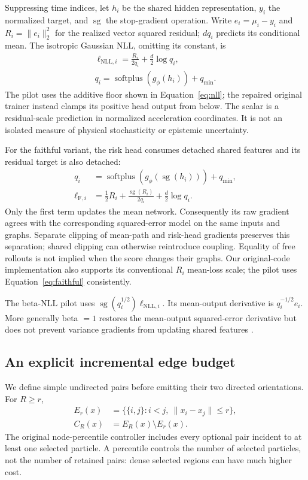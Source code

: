 Suppressing time indices, let $h_i$ be the shared hidden representation, $y_i$ the normalized target, and $\operatorname{sg}$ the stop-gradient operation. Write $e_i=\mu_i-y_i$ and $R_i=\|e_i\|_2^2$ for the realized vector squared residual; $dq_i$ predicts its conditional mean. The isotropic Gaussian NLL, omitting its constant, is
\begin{align}
 \ell_{\mathrm{NLL},i}=\frac{R_i}{2q_i}+\frac d2\log q_i,\nonumber\\
 q_i=\operatorname{softplus}(g_\phi(h_i))+q_{\min}.
 \label{eq:nll}
\end{align}
The pilot uses the additive floor shown in Equation~\ref{eq:nll}; the repaired original trainer instead clamps its positive head output from below. The scalar is a residual-scale prediction in normalized acceleration coordinates. It is not an isolated measure of physical stochasticity or epistemic uncertainty.

For the faithful variant, the risk head consumes detached shared features and its residual target is also detached:
\begin{align}
 q_i&=\operatorname{softplus}(g_\phi(\operatorname{sg}(h_i)))+q_{\min},\nonumber\\
 \ell_{\mathrm F,i}&=\tfrac12R_i+
 \frac{\operatorname{sg}(R_i)}{2q_i}+\frac d2\log q_i.
 \label{eq:faithful}
\end{align}
Only the first term updates the mean network. Consequently its raw gradient agrees with the corresponding squared-error model on the same inputs and graphs. Separate clipping of mean-path and risk-head gradients preserves this separation; shared clipping can otherwise reintroduce coupling. Equality of free rollouts is not implied when the score changes their graphs. Our original-code implementation also supports its conventional $R_i$ mean-loss scale; the pilot uses Equation~\ref{eq:faithful} consistently.

The beta-NLL pilot uses
$\operatorname{sg}(q_i^{1/2})\ell_{\mathrm{NLL},i}$.
Its mean-output derivative is $q_i^{-1/2}e_i$. More generally beta $=1$ restores the mean-output squared-error derivative but does not prevent variance gradients from updating shared features \citep{stirn2023}.

\subsection{An explicit incremental edge budget}
We define simple undirected pairs before emitting their two directed orientations. For $R\ge r$,
\begin{align}
 E_r(x)&=\{\{i,j\}:i<j,\ \|x_i-x_j\|\le r\},\nonumber\\
 C_R(x)&=E_R(x)\setminus E_r(x).
\end{align}
The original node-percentile controller includes every optional pair incident to at least one selected particle. A percentile controls the number of selected particles, not the number of retained pairs: dense selected regions can have much higher cost.

